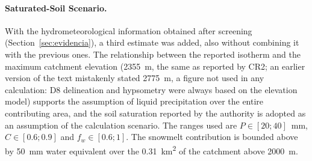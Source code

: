 \paragraph{Saturated-Soil Scenario.} With the hydrometeorological information obtained after screening (Section~\ref{sec:evidencia}), a third estimate was added, also without combining it with the previous ones. The relationship between the reported isotherm and the maximum catchment elevation (\SI{2355}{m}, the same as reported by CR2; an earlier version of the text mistakenly stated \SI{2775}{m}, a figure not used in any calculation: D8 delineation and hypsometry were always based on the elevation model) supports the assumption of liquid precipitation over the entire contributing area, and the soil saturation reported by the authority is adopted as an assumption of the calculation scenario. The ranges used are $P\in[20;40]$~\si{mm}, $C\in[0.6;0.9]$ and $f_w\in[0.6;1]$. The snowmelt contribution is bounded above by \SI{50}{mm} water equivalent over the \SI{0.31}{km^2} of the catchment above \SI{2000}{m}.
